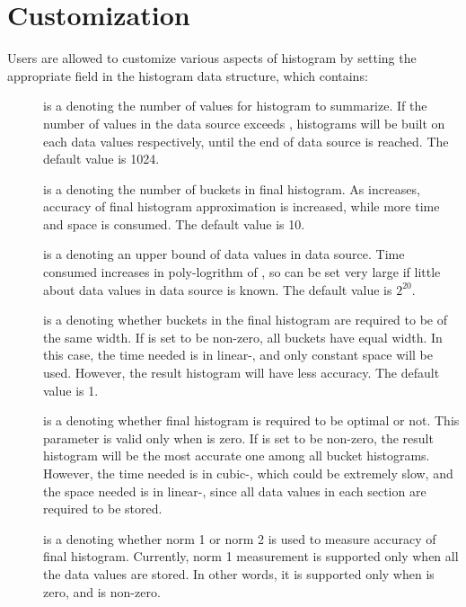 \section{Customization}
\label{sec:histograms-customization}
Users are allowed to customize various aspects of histogram by 
setting the appropriate field in the histogram data structure, 
which contains: 

\begin{description}
\item[] is a  denoting the number of values
  for histogram to summarize. If the number of values in the data
  source exceeds , histograms will be built on each
   data values respectively, until the end of data
  source is reached. The default value is 1024.

\item[] is a  denoting the number of buckets
  in final histogram. As  increases, accuracy of final
  histogram approximation is increased, while more time and space is
  consumed. The default value is 10.

\item[] is a  denoting an upper bound of data
  values in data source. Time consumed increases in poly-logrithm of
  , so  can be set very large if little about
  data values in data source is known. The default value is $2^{20}$.

\item[] is a  denoting whether buckets in the final
  histogram are required to be of the same width. If  is
  set to be non-zero, all buckets have equal width. In this case,
  the time needed is in linear-, and only constant space will
  be used. However, the result histogram will have less accuracy. The
  default value is 1.

\item[] is a  denoting whether final histogram
  is required to be optimal or not. This parameter is valid only
  when  is zero. If  is set to be
  non-zero, the result histogram will be the most accurate one among
  all  bucket histograms. However, the time needed is in
  cubic-, which could be extremely slow, and the space
  needed is in linear-, since all data values in each
   section are required to be stored.

\item[] is a  denoting whether norm 1 or norm 2
  is used to measure accuracy of final histogram. Currently, norm 1
  measurement is supported only when all the data values are
  stored. In other words, it is supported only when  is
  zero, and  is non-zero. 


\end{description}
